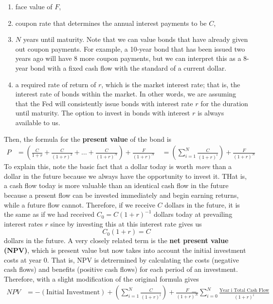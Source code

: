 \documentclass{article}
\begin{document}
    \begin{enumerate}
      \item face value of $F$,
      \item coupon rate that determines the annual interest payments to be $C$,
      \item $N$ years until maturity. Note that we can value bonds that have already given out coupon payments. For example, a 10-year bond that has been issued two years ago will have 8 more coupon payments, but we can interpret this as a 8-year bond with a fixed cash flow with the standard of a current dollar.
      \item a required rate of return of $r$, which is the market interest rate; that is, the interest rate of bonds within the market. In other words, we are assuming that the Fed will consistently issue bonds with interest rate $r$ for the duration until maturity. The option to invest in bonds with interest $r$ is always available to us.
    \end{enumerate}
    Then, the formula for the \textbf{present value} of the bond is
    \begin{align*}
      P & = \left( \frac{C}{1 + r} + \frac{C}{(1+r)^2} + \ldots + \frac{C}{(1+r)^N} \right) + \frac{F}{(1+r)^N} \
      & = \left( \sum_{i=1}^N \frac{C}{(1+r)^i} \right) + \frac{F}{(1+r)^N}
    \end{align*}
    To explain this, note the basic fact that a dollar today is worth \textit{more} than a dollar in the future because we always have the opportunity to invest it. THat is, a cash flow today is more valuable than an identical cash flow in the future because a present flow can be invested immediately and begin earning returns, while a future flow cannot. Therefore, if we receive $C$ dollars in the future, it is the same as if we had received $C_0 = C (1 + r)^{-1}$ dollars today at prevailing interest rates $r$ since by investing this at this interest rate gives us
    \begin{equation}
      C_0 (1+r) = C
    \end{equation}
    dollars in the future. A very closely related term is the \textbf{net present value (NPV)}, which is present value but now takes into account the initial investment costs at year $0$. That is, NPV is detrermined by calculating the costs (negative cash flows) and benefits (positive cash flows) for each period of an investment. Therefore, with a slight modification of the original formula gives
    \begin{align*}
      NPV & = -(\text{Initial Investment}) + \left( \sum_{i=1}^N \frac{C}{(1+r)^i} \right) + \frac{F}{(1+r)^N} \
      & = \sum_{i=0}^N \frac{\text{Year i Total Cash Flow}}{(1 + r)^i}
    \end{align*}
\end{document}
